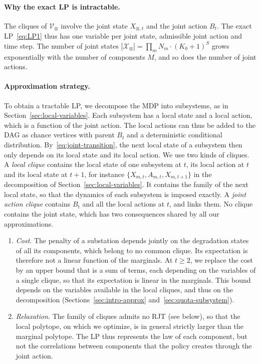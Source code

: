 \documentclass{article}
\begin{document}
\paragraph{Why the exact LP is intractable.}
The cliques of $\mathcal{V}_\otimes$ involve the joint state $X_{\otimes,t}$ and the joint action $B_t$. The exact
LP~\eqref{eq:LP1} thus has one variable per joint state, admissible joint action and time step. The number of joint
states $|\mathcal{X}_\otimes| = \prod_m N_m \cdot (K_0+1)^S$ grows exponentially with the number of components $M$, and
so does the number of joint actions.

\paragraph{Approximation strategy.}
To obtain a tractable LP, we decompose the MDP into subsystems, as in Section~\ref{sec:local-variables}. Each subsystem
has a local state and a local action, which is a function of the joint action. The local actions can thus be added to
the DAG as chance vertices with parent $B_t$ and a deterministic conditional distribution. By~\eqref{eq:joint-transition},
the next local state of a subsystem then only depends on its local state and its local action. We use two kinds of
cliques. A \emph{local clique} contains the local state of one subsystem at $t$, its local action at $t$ and its local
state at $t+1$, for instance $\{X_{m,t}, A_{m,t}, X_{m,t+1}\}$ in the decomposition of
Section~\ref{sec:local-variables}. It contains the family of the next local state, so that the dynamics of each
subsystem is imposed exactly. A \emph{joint action clique} contains $B_t$ and all the local actions at $t$, and links
them. No clique contains the joint state, which has two consequences shared by all our approximations.
\begin{enumerate}
  \item \emph{Cost}. The penalty of a substation depends jointly on the degradation states of all its components, which
        belong to no common clique. Its expectation is therefore not a linear function of the marginals. At $t \ge 2$,
        we replace the cost by an upper bound that is a sum of terms, each depending on the variables of a single
        clique, so that its expectation is linear in the marginals. This bound depends on the variables available in
        the local cliques, and thus on the decomposition (Sections~\ref{sec:intro-approx}
        and~\ref{sec:quota-subsystem}).
  \item \emph{Relaxation}. The family of cliques admits no RJT (see below), so that the local polytope, on which we
        optimize, is in general strictly larger than the marginal polytope. The LP thus represents the law of each
        component, but not the correlations between components that the policy creates through the joint action.
\end{enumerate}
\end{document}
